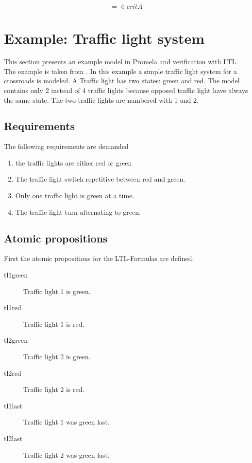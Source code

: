 \documentclass[a4paper, twoside]{article}
\begin{document}
\[
= \lozenge critA
\]

\section{Example: Traffic light system}
\label{sec:example}

This section presents an example model in Promela and verification with LTL. The example is taken from \cite{kleuker09}. In this example a simple traffic light system for a crossroads is modeled. A Traffic light has two states: green and red. The model contains only 2 instead of 4 traffic lights because opposed traffic light have always the same state. The two traffic lights are numbered with 1 and 2.

\subsection{Requirements}
\label{sec:requirements}

The following requirements are demanded
\begin{enumerate}
\item the traffic lights are either red or green
\item The traffic light switch repetitive between red and green.
\item Only one traffic light is green at a time.
\item The traffic light turn alternating to green.
\end{enumerate}

\subsection{Atomic propositions}
\label{sec:trafficlightap}

First the atomic propositions for the LTL-Formulas are defined:

\begin{description}
\item[tl1green] Traffic light 1 is green.
\item[tl1red] Traffic light 1 is red.
\item[tl2green] Traffic light 2 is green.
\item[tl2red] Traffic light 2 is red.
\item[tl1last] Traffic light 1 was green last.
\item[tl2last] Traffic light 2 was green last.
\end{description}
\end{document}
